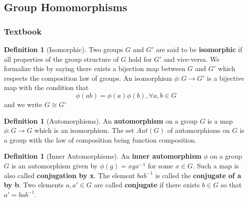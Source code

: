 \documentclass[12pt]{article}
\theoremstyle{definition}
\newtheorem{defn}[thm]{Definition}
\theoremstyle{remark}
\numberwithin{equation}{section}
\newcommand\B[1]{\textbf{ #1}}
\begin{document}
\vspace{15pt}


\subsection{Group Homomorphisms}

\subsubsection{Textbook}

\begin{defn}[Isomorphic]
        Two groups $G$ and $G'$ are said to be \B{isomorphic} if all properties of the group structure of $G$ hold for $G'$ and vice-versa. We formalize this by saying there exists a bijection map between $G$ and $G'$ which respects the composition law of groups. An isomorphism $\phi:G\rightarrow G'$ is a bijective map with the condition that \begin{equation}
                \phi(ab) = \phi(a)\phi(b),\forall a,b \in G
        \end{equation}
        and we write $G \cong G'$
\end{defn}

\vspace{15pt}

\begin{defn}[Automorphisms]
        An \B{automorphism} on a group $G$ is a map $\phi:G\rightarrow G$ which is an isomorphism. The set $Aut(G)$ of automorphisms on $G$ is a group with the law of composition being function composition.
\end{defn}

\vspace{15pt}

\begin{defn}[Inner Automorphisms]
        An \B{inner automorphism} $\phi$ on a group $G$ is an automorphism given by $\phi(g) = xgx^{-1}$ for some $x \in G$. Such a map is also called \B{conjugation by x}. The element $bab^{-1}$ is called the \B{conjugate of a by b}. Two elements $a,a' \in G$ are called \B{conjugate} if there exists $b \in G$ so that $a' = bab^{-1}$.
\end{defn}


\vspace{15pt}
\end{document}
